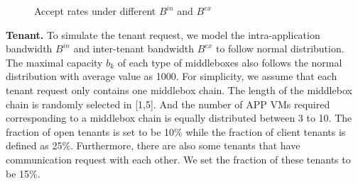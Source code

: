 \documentclass[review]{elsarticle}
\begin{document}
\begin{figure}[H]
	\centering
	
	\caption{Accept rates under different $B^{in}$ and $ B^{ex}$}
	\label{fig:accept_rate}
\end{figure}

\textbf{Tenant.} To simulate the tenant request, we model the intra-application bandwidth $B^{in}$ and inter-tenant bandwidth $B^{ex}$ to follow normal distribution. The maximal capacity $b_k$ of each type of middleboxes also follows the normal distribution with average value as 1000. For simplicity, we assume that each tenant request only contains one middlebox chain. The length of the middlebox chain is randomly selected in [1,5]. And the number of APP VMs required corresponding to a middlebox chain is equally distributed between 3 to 10. The fraction of open tenants is set to be 10\% while the fraction of client tenants is defined as 25\%. Furthermore, there are also some tenants that have communication request with each other. We set the fraction of these tenants to be 15\%.  
\end{document}
